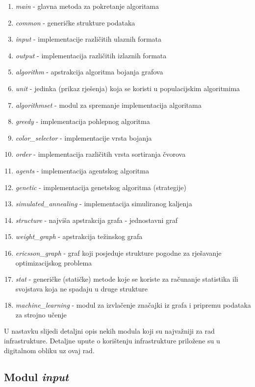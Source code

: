 \documentclass[times, utf8, diplomski, numeric]{fer}
\begin{document}
\begin{enumerate}
	\item \emph{main} - glavna metoda za pokretanje algoritama
	\item \emph{common} - generičke strukture podataka
	\item \emph{input} - implementacije različitih ulaznih formata
	\item \emph{output} - implementacija različitih izlaznih formata
	\item \emph{algorithm} - apstrakcija algoritma bojanja grafova
	\item \emph{unit} - jedinka (prikaz rješenja) koja se koristi u populacijskim algoritmima
	\item \emph{algorithmset} - modul za spremanje implementacija algoritama
	\item \emph{greedy} - implementacija pohlepnog algoritma
	\item \emph{color\_selector} - implementacije vrsta bojanja
	\item \emph{order} - implementacija različitih vrsta sortiranja čvorova
	\item \emph{agents} - implementacija agentskog algoritma
	\item \emph{genetic} - implementacija genetskog algoritma (strategije)
	\item \emph{simulated\_annealing} - implementacija simuliranog kaljenja
	\item \emph{structure} - najviša apstrakcija grafa - jednostavni graf
	\item \emph{weight\_graph} - apstrakcija težinskog grafa 
	\item \emph{ericsson\_graph} - graf koji posjeduje strukture pogodne za rješavanje optimizacijskog problema
	\item \emph{stat} - generičke (statičke) metode koje se koriste za računanje statistika ili svojstava koja ne spadaju u druge strukture
	\item \emph{machine\_learning} - modul za izvlačenje značajki iz grafa i pripremu podataka za strojno učenje
\end{enumerate}

U nastavku slijedi detaljni opis nekih modula koji su najvažniji za rad infrastrukture. Detaljne upute o korištenju infrastrukture priložene su u digitalnom obliku uz ovaj rad.

\subsection{Modul \emph{input}}
\end{document}
